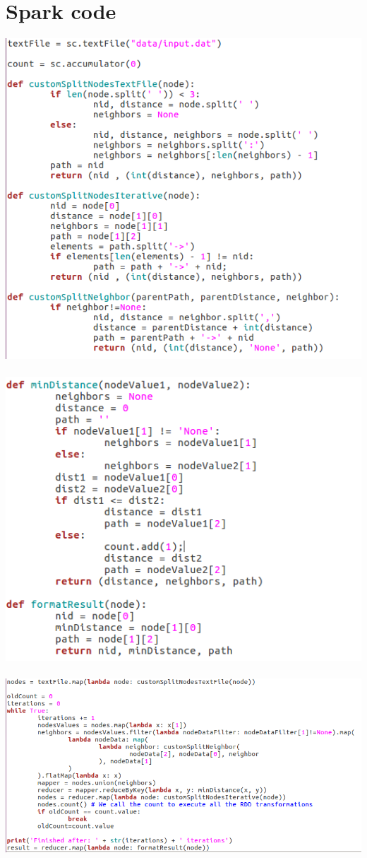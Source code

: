 \documentclass[english]{article}
\begin{document}
\section{Spark code}
\includegraphics[scale=0.7]{img/spark-code-1.png}
$ $\\
\includegraphics[scale=0.7]{img/spark-code-2.png}
$ $\\
\includegraphics[scale=0.7]{img/spark-code-3.png}
\end{document}
